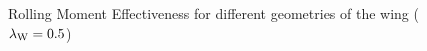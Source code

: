 \begin{figure}[H]
\centering
{} \\
 \\
\caption[Rolling Moment Effectiveness for $\lambdaW = 0.5$] {Rolling Moment Effectiveness for different geometries of the wing ($\lambdaW = 0.5$)}
\label{rme05}
\end{figure}

